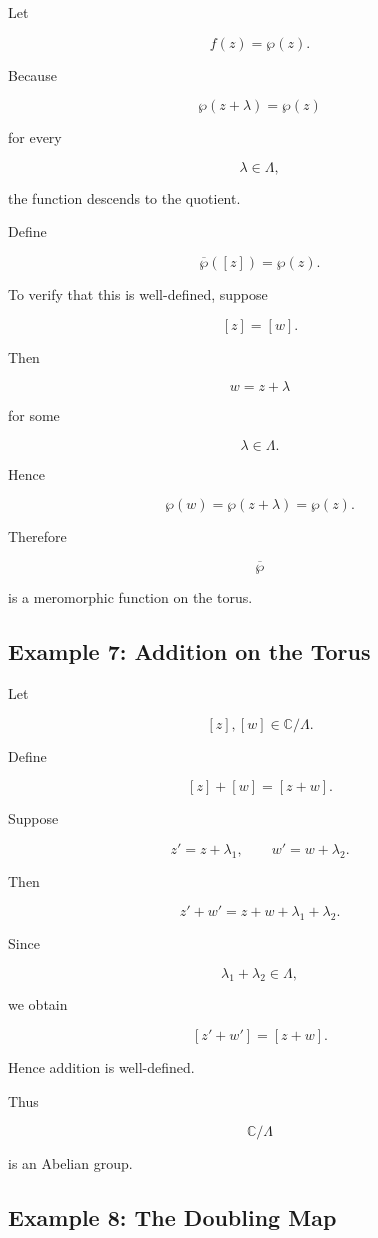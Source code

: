 \documentclass[12pt,a4paper]{article}
\theoremstyle{notespace}
\begin{document}
Let

\[
f(z)
=
\wp(z).
\]

Because

\[
\wp(z+\lambda)
=
\wp(z)
\]

for every

\[
\lambda\in\Lambda,
\]

the function descends to the quotient.

Define

\[
\overline{\wp}([z])
=
\wp(z).
\]

To verify that this is well-defined, suppose

\[
[z]=[w].
\]

Then

\[
w=z+\lambda
\]

for some

\[
\lambda\in\Lambda.
\]

Hence

\[
\wp(w)
=
\wp(z+\lambda)
=
\wp(z).
\]

Therefore

\[
\overline{\wp}
\]

is a meromorphic function on the torus.

\subsection{Example 7: Addition on the Torus}

Let

\[
[z],[w]
\in
\mathbb C/\Lambda.
\]

Define

\[
[z]+[w]
=
[z+w].
\]

Suppose

\[
z'=z+\lambda_1,
\qquad
w'=w+\lambda_2.
\]

Then

\[
z'+w'
=
z+w+\lambda_1+\lambda_2.
\]

Since

\[
\lambda_1+\lambda_2
\in
\Lambda,
\]

we obtain

\[
[z'+w']
=
[z+w].
\]

Hence addition is well-defined.

Thus

\[
\mathbb C/\Lambda
\]

is an Abelian group.

\subsection{Example 8: The Doubling Map}
\end{document}

